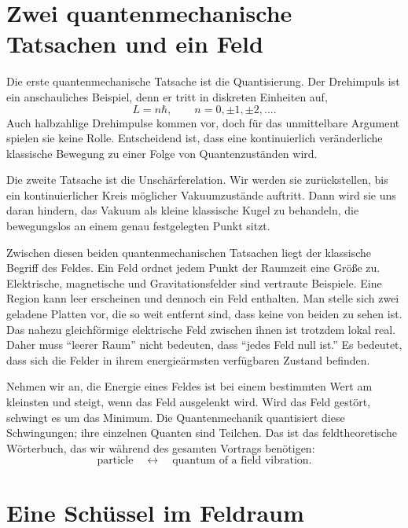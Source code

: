 \section{Zwei quantenmechanische Tatsachen und ein Feld}

Die erste quantenmechanische Tatsache ist die Quantisierung. Der Drehimpuls ist ein anschauliches Beispiel, denn er tritt in diskreten Einheiten auf,
\begin{equation}
L=n\hbar,
\qquad
n=0,\pm1,\pm2,\ldots .
\end{equation}
Auch halbzahlige Drehimpulse kommen vor, doch für das unmittelbare Argument spielen sie keine Rolle. Entscheidend ist, dass eine kontinuierlich veränderliche klassische Bewegung zu einer Folge von Quantenzuständen wird.

Die zweite Tatsache ist die Unschärferelation. Wir werden sie zurückstellen, bis ein kontinuierlicher Kreis möglicher Vakuumzustände auftritt. Dann wird sie uns daran hindern, das Vakuum als kleine klassische Kugel zu behandeln, die bewegungslos an einem genau festgelegten Punkt sitzt.

Zwischen diesen beiden quantenmechanischen Tatsachen liegt der klassische Begriff des Feldes. Ein Feld ordnet jedem Punkt der Raumzeit eine Größe zu. Elektrische, magnetische und Gravitationsfelder sind vertraute Beispiele. Eine Region kann leer erscheinen und dennoch ein Feld enthalten. Man stelle sich zwei geladene Platten vor, die so weit entfernt sind, dass keine von beiden zu sehen ist. Das nahezu gleichförmige elektrische Feld zwischen ihnen ist trotzdem lokal real. Daher muss ``leerer Raum'' nicht bedeuten, dass ``jedes Feld null ist.'' Es bedeutet, dass sich die Felder in ihrem energieärmsten verfügbaren Zustand befinden.

Nehmen wir an, die Energie eines Feldes ist bei einem bestimmten Wert am kleinsten und steigt, wenn das Feld ausgelenkt wird. Wird das Feld gestört, schwingt es um das Minimum. Die Quantenmechanik quantisiert diese Schwingungen; ihre einzelnen Quanten sind Teilchen. Das ist das feldtheoretische Wörterbuch, das wir während des gesamten Vortrags benötigen:
\begin{equation}
\text{particle}
\quad\longleftrightarrow\quad
\text{quantum of a field vibration}.
\end{equation}

\section{Eine Schüssel im Feldraum}

